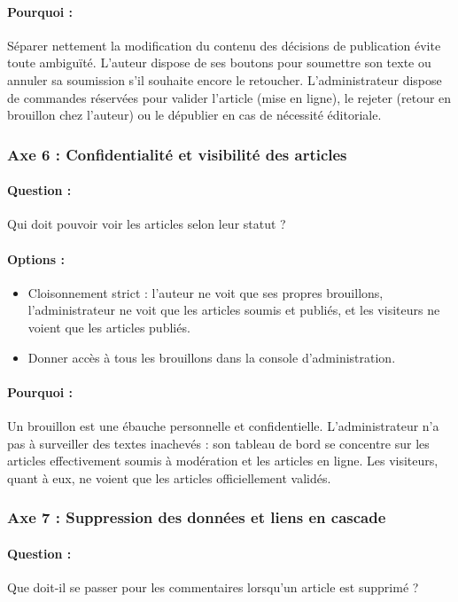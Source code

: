 \documentclass[11pt,a4paper]{article}
\begin{document}
\paragraph{Pourquoi :} Séparer nettement la modification du contenu des décisions de publication évite toute ambiguïté. L'auteur dispose de ses boutons pour soumettre son texte ou annuler sa soumission s'il souhaite encore le retoucher. L'administrateur dispose de commandes réservées pour valider l'article (mise en ligne), le rejeter (retour en brouillon chez l'auteur) ou le dépublier en cas de nécessité éditoriale.

\subsubsection{Axe 6 : Confidentialité et visibilité des articles}
\paragraph{Question :} Qui doit pouvoir voir les articles selon leur statut ?
\paragraph{Options :}
\begin{itemize}
    \item[$\boxtimes$] Cloisonnement strict : l'auteur ne voit que ses propres brouillons, l'administrateur ne voit que les articles soumis et publiés, et les visiteurs ne voient que les articles publiés.
    \item[$\square$] Donner accès à tous les brouillons dans la console d'administration.
\end{itemize}
\paragraph{Pourquoi :} Un brouillon est une ébauche personnelle et confidentielle. L'administrateur n'a pas à surveiller des textes inachevés : son tableau de bord se concentre sur les articles effectivement soumis à modération et les articles en ligne. Les visiteurs, quant à eux, ne voient que les articles officiellement validés.

\subsubsection{Axe 7 : Suppression des données et liens en cascade}
\paragraph{Question :} Que doit-il se passer pour les commentaires lorsqu'un article est supprimé ?
\end{document}
